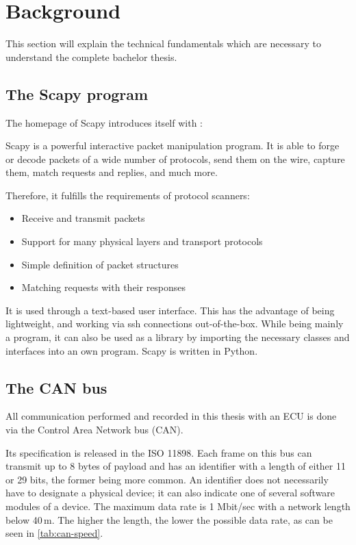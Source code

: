 \chapter{Background}

This section will explain the technical fundamentals which are necessary to understand the complete bachelor thesis.

\section{The Scapy program}
\label{sec:scapy}

The homepage of Scapy introduces itself with \cite{scapy}:
\begin{displayquote}
Scapy is a powerful interactive packet manipulation program. It is able to forge or decode packets of a wide number of protocols, send them on the wire, capture them, match requests and replies, and much more.
\end{displayquote}

Therefore, it fulfills the requirements of protocol scanners:
\begin{itemize}
    \item Receive and transmit packets
    \item Support for many physical layers and transport protocols
    \item Simple definition of packet structures
    \item Matching requests with their responses
\end{itemize} 

It is used through a text-based user interface. This has the advantage of being lightweight, and working via ssh connections out-of-the-box. While being mainly a program, it can also be used as a library by importing the necessary classes and interfaces into an own program. Scapy is written in Python.


\section{The CAN bus}

All communication performed and recorded in this thesis with an ECU is done via the Control Area Network bus (CAN).

Its specification is released in the ISO 11898. Each frame on this bus can transmit up to 8 bytes of payload and has an identifier with a length of either 11 or 29 bits, the former being more common. An identifier does not necessarily have to designate a physical device; it can also indicate one of several software modules of a device.
The maximum data rate is 1 Mbit/sec with a network length below 40\,m. The higher the length, the lower the possible data rate, as can be seen in \autoref{tab:can-speed}.

